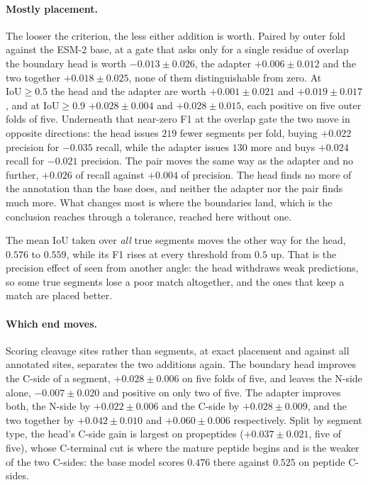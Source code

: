 \documentclass{article}
\begin{document}
\paragraph{Mostly placement.} The looser the criterion, the less either addition is worth.
Paired by outer fold against the ESM-2 base, at a gate that asks only for a single residue of
overlap the boundary head is worth $-0.013\pm0.026$, the adapter $+0.006\pm0.012$ and the two
together $+0.018\pm0.025$, none of them distinguishable from zero. At $\mathrm{IoU}\ge0.5$ the head and the adapter are worth $+0.001\pm0.021$ and
$+0.019\pm0.017$, and at $\mathrm{IoU}\ge0.9$ $+0.028\pm0.004$ and $+0.028\pm0.015$, each positive
on five outer folds of five. Underneath
that near-zero F1 at the overlap gate the two move in opposite directions: the head issues $219$
fewer segments per fold, buying $+0.022$ precision for $-0.035$ recall, while the adapter issues
$130$ more and buys $+0.024$ recall for $-0.021$ precision. The pair moves the same way as the adapter and no further,
$+0.026$ of recall against $+0.004$ of precision. The head finds no more of the annotation than the
base does, and neither the adapter nor the pair finds much more. What changes most is where the boundaries land, which
is the conclusion  reaches through a tolerance, reached here without one.

The mean IoU taken over \emph{all} true segments moves the other way for the head, $0.576$ to
$0.559$, while its F1 rises at every threshold from $0.5$ up. That is the precision effect of
 seen from another angle: the head withdraws weak predictions, so some true
segments lose a poor match altogether, and the ones that keep a match are placed better.

\paragraph{Which end moves.} Scoring cleavage sites rather than segments, at exact placement and
against all annotated sites, separates the two additions again. The boundary head improves the
C-side of a segment, $+0.028\pm0.006$ on five folds of five, and leaves the N-side alone,
$-0.007\pm0.020$ and positive on only two of five. The adapter improves both, the N-side by $+0.022\pm0.006$ and the C-side by $+0.028\pm0.009$,
and the two together by $+0.042\pm0.010$ and $+0.060\pm0.006$ respectively. Split by segment
type, the head's C-side gain is largest on propeptides ($+0.037\pm0.021$, five of five), whose
C-terminal cut is where the mature peptide begins and is the weaker of the two C-sides: the base
model scores $0.476$ there against $0.525$ on peptide C-sides.
\end{document}
